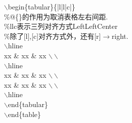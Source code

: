 \documentclass{article}
\begin{document}
\begin{itemize}
\begin{multicols}{2}
{\begin{minipage}{7cm}
							\hspace*{2em}$\backslash$begin\{tabular\}\{\fbox{@\{\}}|l|l|c|\}\\
							{\small \hspace*{2em}\%@\{\}的作用为取消表格左右间距.}\\
							{\small \hspace*{2em}\%llc表示三列对齐方式LeftLeftCenter}\\
							{\small \hspace*{2em}\%除了[l],[c]对齐方式外，还有[r]$\to$right.}\\
							\hspace*{4em}$\backslash$hline\\
							\hspace*{6em}xx \& xx \& xx $\backslash\backslash$\\
							\hspace*{4em}$\backslash$hline\\
							\hspace*{6em}xx \& xx \& xx $\backslash\backslash$\\
							\hspace*{6em}xx \& xx \& xx $\backslash\backslash$\\
							\hspace*{4em}$\backslash$hline\\
							\hspace*{2em}$\backslash$end\{tabular\}\\
							$\backslash$end\{table\}
					\end{minipage}}
				\end{multicols}
			\end{itemize}
\end{document}
